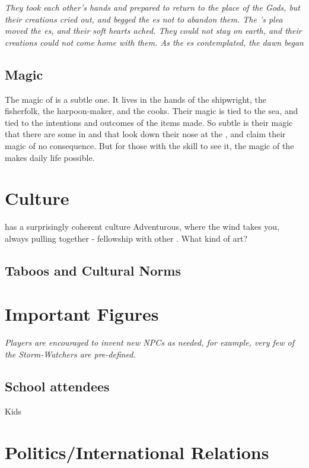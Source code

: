 \documentclass[blue]{GL2020}
\begin{document}
\emph{They took each other's hands and prepared to return to the place of the Gods, but their creations cried out, and begged the \cEbb{\God}es not to abandon them. The \pShippies{}'s plea moved the \cEbb{\God}es, and their soft hearts ached. They could not stay on earth, and their creations could not come home with them. As the \cEbb{\God}es contemplated, the dawn began}

\subsection*{Magic}
The magic of \pShip{} is a subtle one. It lives in the hands of the shipwright, the fisherfolk, the harpoon-maker, and the cooks. Their magic is tied to the sea, and tied to the intentions and outcomes of the items made. So subtle is their magic that there are some in \pFarm{} and \pTech{} that look down their nose at the \pShippies{}, and claim their magic of no consequence. But for those with the skill to see it, the magic of the \pShippies{} makes daily life possible.

\section*{Culture}
\pShip{} has a surprisingly coherent culture
Adventurous, where the wind takes you, always pulling together - fellowship with other \pShippies{}.
What kind of art?

\subsection*{Taboos and Cultural Norms}


\section*{Important Figures}

\emph{Players are encouraged to invent new NPCs as needed, for example, very few of the Storm-Watchers are pre-defined.}

\subsection*{School attendees}

Kids


\section*{Politics/International Relations}
\end{document}
